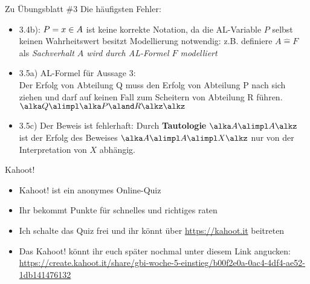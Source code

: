 \begin{frame}{Zu Übungsblatt \#3}
	Die häufigsten Fehler:
	\begin{itemize}[<+->]
		\item 3.4b): $P=x\in A$ ist keine korrekte Notation, da die AL-Variable $P$ selbst keinen Wahrheitswert besitzt
		\implitem Modellierung notwendig: z.B. definiere $A \widehat{=} F$ als \textit{Sachverhalt $A$ wird durch AL-Formel $F$ modelliert}
		\item 3.5a) AL-Formel für Aussage 3: \\
		Der Erfolg von Abteilung Q muss den Erfolg von Abteilung P nach sich ziehen
		und darf auf keinen Fall zum Scheitern von Abteilung R führen.
		\implitem $\bleftBr Q \bimp \bleftBr P \bund R \brightBr \brightBr$
		\item 3.5c) Der Beweis ist fehlerhaft: Durch \textbf{Tautologie} $\bleftBr A \bimp A \brightBr$ ist der Erfolg des Beweises
		$\bleftBr A \bimp A \bimp X \brightBr$ nur von der Interpretation von $X$ abhängig.
	\end{itemize}
\end{frame}

 \framePrevEpisode

\begin{frame}{Kahoot!}
	\begin{itemize}
		\item Kahoot! ist ein anonymes Online-Quiz
		\item Ihr bekommt Punkte für schnelles und richtiges raten
		\item Ich schalte das Quiz frei und ihr könnt über \url{https://kahoot.it} beitreten
		\pause
		\item Das Kahoot! könnt ihr euch später nochmal unter diesem Link angucken: \\
			\url{https://create.kahoot.it/share/gbi-woche-5-einstieg/b00f2e0a-0ac4-4df4-ae52-1db141476132}
	\end{itemize}
\end{frame}
 

